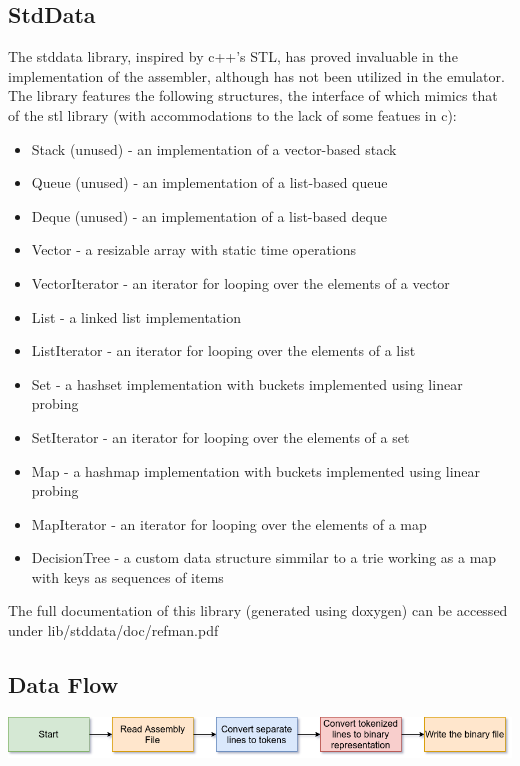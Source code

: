 \documentclass[11pt]{article}
\begin{document}
\subsection*{StdData}
The stddata library, inspired by c++'s STL, has proved invaluable in the implementation of the assembler, although has not been utilized in the emulator. The library features the following structures, the interface of which mimics that of the stl library (with accommodations to the lack of some featues in c):
\begin{itemize}
\item Stack (unused) - an implementation of a vector-based stack
\item Queue (unused) - an implementation of a list-based queue
\item Deque (unused) - an implementation of a list-based deque
\item Vector - a resizable array with static time operations
\item VectorIterator - an iterator for looping over the elements of a vector
\item List - a linked list implementation
\item ListIterator - an iterator for looping over the elements of a list
\item Set - a hashset implementation with buckets implemented using linear probing
\item SetIterator - an iterator for looping over the elements of a set
\item Map - a hashmap implementation with buckets implemented using linear probing
\item MapIterator - an iterator for looping over the elements of a map
\item DecisionTree - a custom data structure simmilar to a trie working as a map with keys as sequences of items
\end{itemize}
The full documentation of this library (generated using doxygen) can be accessed under lib/stddata/doc/refman.pdf
\subsection*{Data Flow}
\includegraphics[scale=0.6]{assembler_dataflow}
\end{document}
